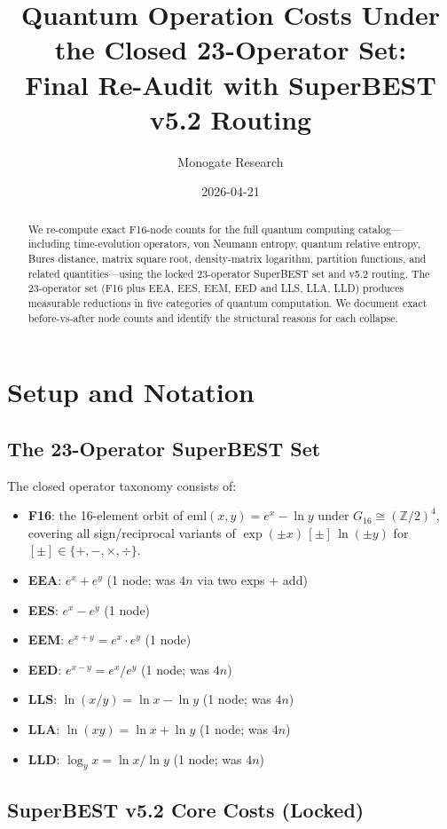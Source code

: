 \documentclass[11pt]{article}
\title{Quantum Operation Costs Under the Closed 23-Operator Set:\\
Final Re-Audit with SuperBEST v5.2 Routing}
\author{Monogate Research}
\date{2026-04-21}
\begin{document}
\maketitle

\begin{abstract}
We re-compute exact F16-node counts for the full quantum computing catalog---including
time-evolution operators, von Neumann entropy, quantum relative entropy, Bures distance,
matrix square root, density-matrix logarithm, partition functions, and related quantities---using
the locked 23-operator SuperBEST set and v5.2 routing.
The 23-operator set (F16 plus EEA, EES, EEM, EED and LLS, LLA, LLD)
produces measurable reductions in five categories of quantum computation.
We document exact before-vs-after node counts and identify the structural reasons
for each collapse.
\end{abstract}

\section{Setup and Notation}

\subsection{The 23-Operator SuperBEST Set}

The closed operator taxonomy consists of:
\begin{itemize}
  \item \textbf{F16}: the 16-element orbit of $\mathrm{eml}(x,y)=e^x-\ln y$ under
    $G_{16}\cong(\mathbb{Z}/2)^4$, covering all sign/reciprocal variants of
    $\exp(\pm x)\,[\pm]\,\ln(\pm y)$ for $[\pm]\in\{+,-,\times,\div\}$.
  \item \textbf{EEA}: $e^x+e^y$ (1 node; was $4n$ via two exps + add)
  \item \textbf{EES}: $e^x-e^y$ (1 node)
  \item \textbf{EEM}: $e^{x+y}=e^x\cdot e^y$ (1 node)
  \item \textbf{EED}: $e^{x-y}=e^x/e^y$ (1 node; was $4n$)
  \item \textbf{LLS}: $\ln(x/y)=\ln x-\ln y$ (1 node; was $4n$)
  \item \textbf{LLA}: $\ln(xy)=\ln x+\ln y$ (1 node; was $4n$)
  \item \textbf{LLD}: $\log_y x=\ln x/\ln y$ (1 node; was $4n$)
\end{itemize}

\subsection{SuperBEST v5.2 Core Costs (Locked)}
\end{document}

